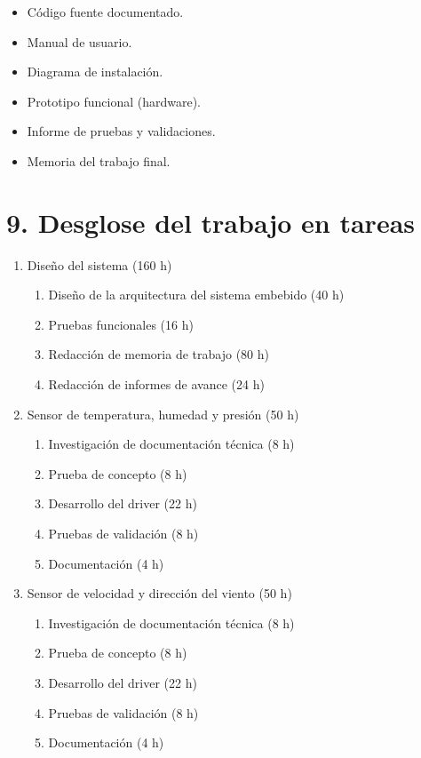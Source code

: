 \documentclass[
11pt, %
codirector, %
]{charter}
\begin{document}
\begin{itemize}
	\item Código fuente documentado.
	\item Manual de usuario.
	\item Diagrama de instalación.
	\item Prototipo funcional (hardware).
	\item Informe de pruebas y validaciones.
	\item Memoria del trabajo final.
\end{itemize}

\section{9. Desglose del trabajo en tareas}
\label{sec:wbs}

\begin{enumerate}

\item Diseño del sistema (160 h)
	\begin{enumerate}
	\item Diseño de la arquitectura del sistema embebido (40 h)
	\item Pruebas funcionales (16 h)
	\item Redacción de memoria de trabajo (80 h)
	\item Redacción de informes de avance (24 h)
	\end{enumerate}

\item Sensor de temperatura, humedad y presión (50 h)
	\begin{enumerate}
	\item Investigación de documentación técnica (8 h)
	\item Prueba de concepto (8 h)
	\item Desarrollo del driver (22 h)
	\item Pruebas de validación (8 h)
	\item Documentación (4 h)
	\end{enumerate}
	
\item Sensor de velocidad y dirección del viento (50 h)
	\begin{enumerate}
	\item Investigación de documentación técnica (8 h)
	\item Prueba de concepto (8 h)
	\item Desarrollo del driver (22 h)
	\item Pruebas de validación (8 h)
	\item Documentación (4 h)
	\end{enumerate}
	

\end{enumerate}
\end{document}

